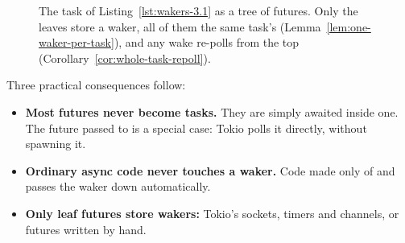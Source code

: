 \begin{figure}[htbp]
{}
    \caption{The task of Listing~\ref{lst:wakers-3.1} as a tree of futures. Only the leaves store a waker, all of them the same task's (Lemma~\ref{lem:one-waker-per-task}), and any wake re-polls from the top (Corollary~\ref{cor:whole-task-repoll}).}
    \label{fig:wakers-3.1}
\end{figure}

Three practical consequences follow:

\begin{itemize}
    \item \textbf{Most futures never become tasks.} They are simply awaited inside one. The future passed to  is a special case: Tokio polls it directly, without spawning it.
    \item \textbf{Ordinary async code never touches a waker.} Code made only of  and  passes the waker down automatically.
    \item \textbf{Only leaf futures store wakers:} Tokio's sockets, timers and channels, or futures written by hand.
\end{itemize}

